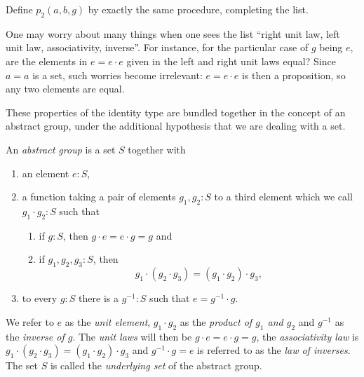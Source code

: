 \begin{xca}\label{xca:p2}
    Define $p_2(a,b,g)$ %
by exactly the same procedure, completing the list.
\end{xca}

\begin{remark}
   One may worry about many things when one sees the list ``right unit law, left unit law, associativity, inverse''.  For instance, for the particular case of $g$ being $e$, are the elements in $e=e\cdot e$ given in the left and right unit laws equal?  Since $a=a$ is a set, such worries become irrelevant: $e=e\cdot e$ is then a proposition, so any two elements are equal.
 \end{remark}

These properties of the identity type are bundled together in the concept of an abstract group, under the additional hypothesis that we are dealing with a set.

  \begin{definition}\label{def:abstractgroup}
    An \emph{abstract group} is a set $S$ together with
\begin{enumerate}
\item an element $e:S$,
\item a function taking a pair of elements $g_1,g_2:S$ to a third element which we call $g_1\cdot g_2:S$ such that
  \begin{enumerate}
  \item %
if $g:S$, then $g\cdot e=e\cdot g=g$ and
  \item %
if $g_1,g_2,g_3:S$, then
$$g_1\cdot(g_2\cdot g_3)=(g_1\cdot g_2)\cdot g_3,$$
  \end{enumerate}
\item %
to every $g:S$ there is a $g^{-1}:S$ such that $%
e=g^{-1}\cdot g$.
\end{enumerate}
We refer to $e$ as the \emph{unit element}, $g_1\cdot g_2$ as the \emph{product of $g_1$ and $g_2$} and $g^{-1}$ as the \emph{inverse of $g$}.  The \emph{unit laws} will then be $g\cdot e=e\cdot g=g$, the \emph{associativity law} is $g_1\cdot(g_2\cdot g_3)=(g_1\cdot g_2)\cdot g_3$ and $%
g^{-1}\cdot g=e$ is referred to as the \emph{law of inverses}.  The set $S$ is called the \emph{underlying set} of the abstract group.
  \end{definition}


